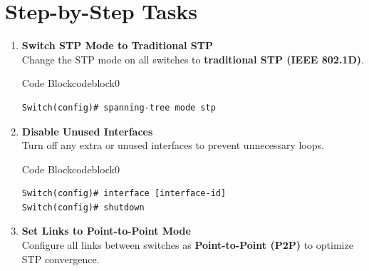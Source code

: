 \documentclass[a4paper]{book}
\begin{document}
\section*{Step-by-Step Tasks}

\begin{enumerate}
	\item \textbf{Switch STP Mode to Traditional STP} \\
	      Change the STP mode on all switches to \textbf{traditional STP (IEEE 802.1D)}.



	      \begin{ocg}{Code Block}{codeblock}{0}
		      \vspace{0.5cm}
		      \begin{lstlisting}
Switch(config)# spanning-tree mode stp
\end{lstlisting}

	      \end{ocg}

	\item \textbf{Disable Unused Interfaces} \\
	      Turn off any extra or unused interfaces to prevent unnecessary loops.



	      \begin{ocg}{Code Block}{codeblock}{0}
		      \vspace{0.5cm}
		      \begin{lstlisting}
Switch(config)# interface [interface-id]
Switch(config)# shutdown

\end{lstlisting}

	      \end{ocg}


	\item \textbf{Set Links to Point-to-Point Mode} \\
	      Configure all links between switches as \textbf{Point-to-Point (P2P)} to optimize STP convergence.




\end{enumerate}
\end{document}
